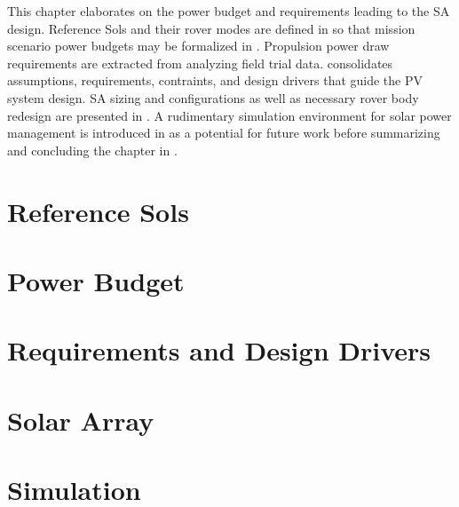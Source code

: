This chapter elaborates on the power budget and requirements leading to the \ac{SA} design. Reference Sols and their rover modes are defined in  so that mission scenario power budgets may be formalized in . Propulsion power draw requirements are extracted from analyzing field trial data.  consolidates assumptions, requirements, contraints, and design drivers that guide the \ac{PV} system design. \ac{SA} sizing and configurations as well as necessary rover body redesign are presented in . A rudimentary simulation environment for solar power management is introduced in  as a potential for future work before summarizing and concluding the chapter in .

\section{Reference Sols}
\label{sec:Design:ReferenceSols}


\clearpage
\section{Power Budget}
\label{sec:Design:PowerBudget}


\clearpage
\section{Requirements and Design Drivers}
\label{sec:Design:RequirementsAndDesignDrivers}


\clearpage
\section{Solar Array}
\label{sec:Design:SolarArray}


\clearpage
\section{Simulation}
\label{sec:Design:Simulation}


